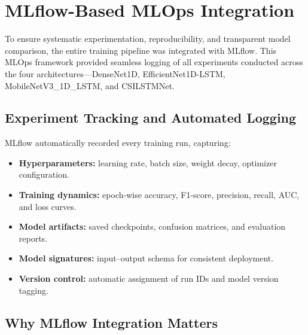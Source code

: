 \section{MLflow-Based MLOps Integration}
\label{sec:mlops}

To ensure systematic experimentation, reproducibility, and transparent model comparison, the entire training pipeline was integrated with MLflow. This MLOps framework provided seamless logging of all experiments conducted across the four architectures—DenseNet1D, EfficientNet1D-LSTM, MobileNetV3\_1D\_LSTM, and CSILSTMNet.

\subsection{Experiment Tracking and Automated Logging}

MLflow automatically recorded every training run, capturing:
\begin{itemize}
    \item \textbf{Hyperparameters:} learning rate, batch size, weight decay, optimizer configuration.
    \item \textbf{Training dynamics:} epoch-wise accuracy, F1-score, precision, recall, AUC, and loss curves.
    \item \textbf{Model artifacts:} saved checkpoints, confusion matrices, and evaluation reports.
    \item \textbf{Model signatures:} input--output schema for consistent deployment.
    \item \textbf{Version control:} automatic assignment of run IDs and model version tagging.
\end{itemize}

\subsection{Why MLflow Integration Matters}

